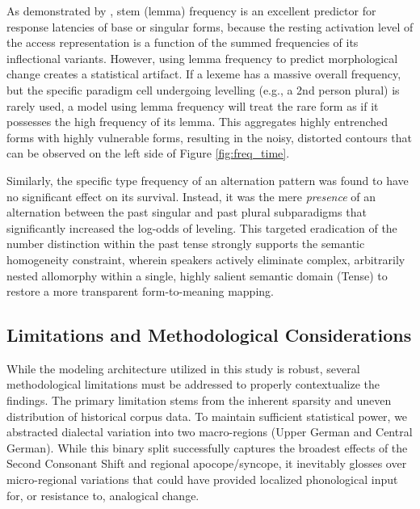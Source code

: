 As demonstrated by \cite{baayen_freq_2003}, stem (lemma) frequency is an excellent predictor for response latencies of base or singular forms, because the resting activation level of the access representation is a function of the summed frequencies of its inflectional variants. However, using lemma frequency to predict morphological change creates a statistical artifact. If a lexeme has a massive overall frequency, but the specific paradigm cell undergoing levelling (e.g., a 2nd person plural) is rarely used, a model using lemma frequency will treat the rare form as if it possesses the high frequency of its lemma. This aggregates highly entrenched forms with highly vulnerable forms, resulting in the noisy, distorted contours that can be observed on the left side of Figure \ref{fig:freq_time}.

Similarly, the specific type frequency of an alternation pattern was found to have no significant effect on its survival. Instead, it was the mere \textit{presence} of an alternation between the past singular and past plural subparadigms that significantly increased the log-odds of leveling. This targeted eradication of the number distinction within the past tense strongly supports the semantic homogeneity constraint, wherein speakers actively eliminate complex, arbitrarily nested allomorphy within a single, highly salient semantic domain (Tense) to restore a more transparent form-to-meaning mapping.

\subsection{Limitations and Methodological Considerations}

While the modeling architecture utilized in this study is robust, several methodological limitations must be addressed to properly contextualize the findings. The primary limitation stems from the inherent sparsity and uneven distribution of historical corpus data. To maintain sufficient statistical power, we abstracted dialectal variation into two macro-regions (Upper German and Central German). While this binary split successfully captures the broadest effects of the Second Consonant Shift and regional apocope/syncope, it inevitably glosses over micro-regional variations that could have provided localized phonological input for, or resistance to, analogical change.

